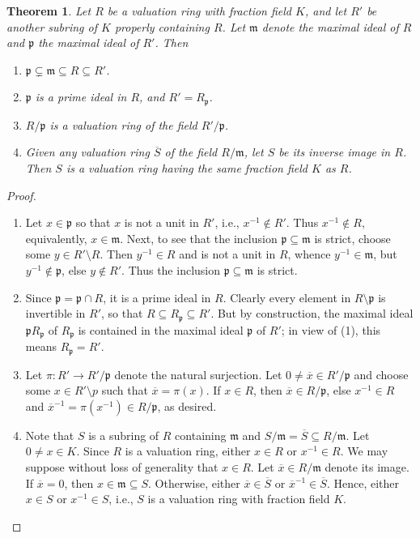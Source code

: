 \documentclass[11pt]{article}
\theoremstyle{thmstyle}
\newtheorem{theorem}{Theorem}[section]
\theoremstyle{defstyle}
\newcommand{\frakm}{\mathfrak{m}} %
\newcommand{\frakp}{\mathfrak{p}} %
\begin{document}
\begin{theorem}
    Let $R$ be a valuation ring with fraction field $K$, and let $R'$ be another subring of $K$ properly containing $R$. Let $\frakm$ denote the maximal ideal of $R$ and $\frakp$ the maximal ideal of $R'$. Then 
    \begin{enumerate}[label=(\arabic*)]
        \item $\frakp\subsetneq\frakm\subseteq R\subseteq R'$.
        \item $\frakp$ is a prime ideal in $R$, and $R' = R_\frakp$. 
        \item $R/\frakp$ is a valuation ring of the field $R'/\frakp$.
        \item Given any valuation ring $\overline S$ of the field $R/\frakm$, let $S$ be its inverse image in $R$. Then $S$ is a valuation ring having the same fraction field $K$ as $R$.
    \end{enumerate}
\end{theorem}
\begin{proof}
\begin{enumerate}[label=(\arabic*)]
    \item Let $x\in\frakp$ so that $x$ is not a unit in $R'$, i.e., $x^{-1}\notin R'$. Thus $x^{-1}\notin R$, equivalently, $x\in\frakm$. Next, to see that the inclusion $\frakp\subseteq\frakm$ is strict, choose some $y\in R'\setminus R$. Then $y^{-1}\in R$ and is not a unit in $R$, whence $y^{-1}\in\frakm$, but $y^{-1}\notin\frakp$, else $y\notin R'$. Thus the inclusion $\frakp\subseteq\frakm$ is strict. 
    
    \item Since $\frakp = \frakp\cap R$, it is a prime ideal in $R$. Clearly every element in $R\setminus\frakp$ is invertible in $R'$, so that $R\subseteq R_\frakp\subseteq R'$. But by construction, the maximal ideal $\frakp R_\frakp$ of $R_\frakp$ is contained in the maximal ideal $\frakp$ of $R'$; in view of (1), this means $R_\frakp = R'$. 
    
    \item Let $\pi\colon R'\to R'/\frakp$ denote the natural surjection. Let $0\ne \overline x\in R'/\frakp$ and choose some $x\in R'\setminus p$ such that $\overline x = \pi(x)$. If $x\in R$, then $\overline x\in R/\frakp$, else $x^{-1}\in R$ and $\overline x^{-1} = \pi(x^{-1})\in R/\frakp$, as desired. 
    
    \item Note that $S$ is a subring of $R$ containing $\frakm$ and $S/\frakm = \overline S\subseteq R/\frakm$. Let $0\ne x\in K$. Since $R$ is a valuation ring, either $x\in R$ or $x^{-1}\in R$. We may suppose without loss of generality that $x\in R$. Let $\overline x \in R/\frakm$ denote its image. If $\overline x = 0$, then $x\in\frakm\subseteq S$. Otherwise, either $\overline x\in\overline S$ or $\overline x^{-1}\in\overline S$. Hence, either $x\in S$ or $x^{-1}\in S$, i.e., $S$ is a valuation ring with fraction field $K$. \qedhere
\end{enumerate}
\end{proof}
\end{document}
